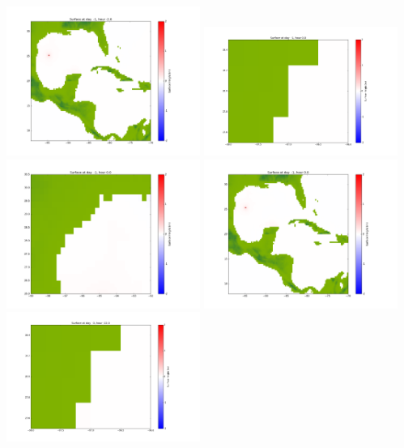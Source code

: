 \documentclass[11pt]{article}
\begin{document}
\vskip 10pt 
\includegraphics[width=0.475\textwidth]{frame0011fig1003.png}
\vskip 10pt 
\includegraphics[width=0.475\textwidth]{frame0012fig1001.png}
\includegraphics[width=0.475\textwidth]{frame0012fig1002.png}
\vskip 10pt 
\includegraphics[width=0.475\textwidth]{frame0012fig1003.png}
\vskip 10pt 
\includegraphics[width=0.475\textwidth]{frame0013fig1001.png}
\end{document}
